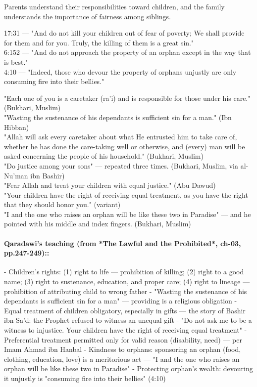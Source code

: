 \documentclass[11pt,a4paper]{article}
\begin{document}
\begin{outcomebox} Parents understand their responsibilities toward children, and the family understands the importance of fairness among siblings. \end{outcomebox}

\begin{quranbox} 17:31 --- "And do not kill your children out of fear of poverty; We shall provide for them and for you. Truly, the killing of them is a great sin." \\ 6:152 --- "And do not approach the property of an orphan except in the way that is best." \\ 4:10 --- "Indeed, those who devour the property of orphans unjustly are only consuming fire into their bellies." \end{quranbox}

\begin{hadithbox} "Each one of you is a caretaker (ra'i) and is responsible for those under his care." (Bukhari, Muslim) \\ "Wasting the sustenance of his dependants is sufficient sin for a man." (Ibn Hibban) \\ "Allah will ask every caretaker about what He entrusted him to take care of, whether he has done the care-taking well or otherwise, and (every) man will be asked concerning the people of his household." (Bukhari, Muslim) \\ "Do justice among your sons" --- repeated three times. (Bukhari, Muslim, via al-Nu'man ibn Bashir) \\ "Fear Allah and treat your children with equal justice." (Abu Dawud) \\ "Your children have the right of receiving equal treatment, as you have the right that they should honor you." (variant) \\ "I and the one who raises an orphan will be like these two in Paradise" --- and he pointed with his middle and index fingers. (Bukhari, Muslim) \end{hadithbox}

\paragraph*{Qaradawi's teaching (from *The Lawful and the Prohibited*, ch-03, pp.247-249)::}  - Children's rights: (1) right to life --- prohibition of killing; (2) right to a good name; (3) right to sustenance, education, and proper care; (4) right to lineage --- prohibition of attributing child to wrong father - "Wasting the sustenance of his dependants is sufficient sin for a man" --- providing is a religious obligation - Equal treatment of children obligatory, especially in gifts --- the story of Bashir ibn Sa'd: the Prophet refused to witness an unequal gift - "Do not ask me to be a witness to injustice. Your children have the right of receiving equal treatment" - Preferential treatment permitted only for valid reason (disability, need) --- per Imam Ahmad ibn Hanbal - Kindness to orphans: sponsoring an orphan (food, clothing, education, love) is a meritorious act --- "I and the one who raises an orphan will be like these two in Paradise" - Protecting orphan's wealth: devouring it unjustly is "consuming fire into their bellies" (4:10)
\end{document}
